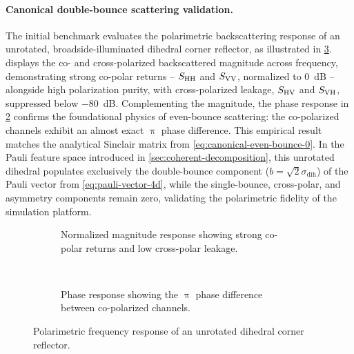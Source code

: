 \paragraph{Canonical double-bounce scattering validation.}
The initial benchmark evaluates the polarimetric backscattering response of an unrotated, broadside-illuminated dihedral corner reflector, as illustrated in \cref{fig:sbr_parametric_dihedral_unrotated}.
 displays the co- and cross-polarized backscattered magnitude across frequency, demonstrating strong co-polar returns -- $S_{\mathrm{HH}}$ and $S_{\mathrm{VV}}$, normalized to \qty{0}{\dB} -- alongside high polarization purity, with cross-polarized leakage, $S_{\mathrm{HV}}$ and $S_{\mathrm{VH}}$, suppressed below \qty{-80}{\dB}.
Complementing the magnitude, the phase response in \cref{fig:sbr_parametric_dihedral_unrotated_phase} confirms the foundational physics of even-bounce scattering: the co-polarized channels exhibit an almost exact $\uppi$ phase difference.
This empirical result matches the analytical Sinclair matrix from \cref{eq:canonical-even-bounce-0}.
In the Pauli feature space introduced in \cref{sec:coherent-decomposition}, this unrotated dihedral populates exclusively the double-bounce component ($b = \sqrt{2}\sigma_{\text{dih}}$) of the Pauli vector from \cref{eq:pauli-vector-4d}, while the single-bounce, cross-polar, and asymmetry components remain zero, validating the polarimetric fidelity of the simulation platform.

\begin{figure}[p]
    \centering
    \begin{subfigure}{\linewidth}
        \centering
        
        \caption{Normalized magnitude response showing strong co-polar returns and low cross-polar leakage.}
        \label{fig:sbr_parametric_dihedral_unrotated_magnitude}
    \end{subfigure}
    \\
    \begin{subfigure}{\linewidth}
        \centering
        
        \caption{Phase response showing the $\uppi$ phase difference between co-polarized channels.}
        \label{fig:sbr_parametric_dihedral_unrotated_phase}
    \end{subfigure}
    \caption{Polarimetric frequency response of an unrotated dihedral corner reflector.}
    \label{fig:sbr_parametric_dihedral_unrotated}
\end{figure}

